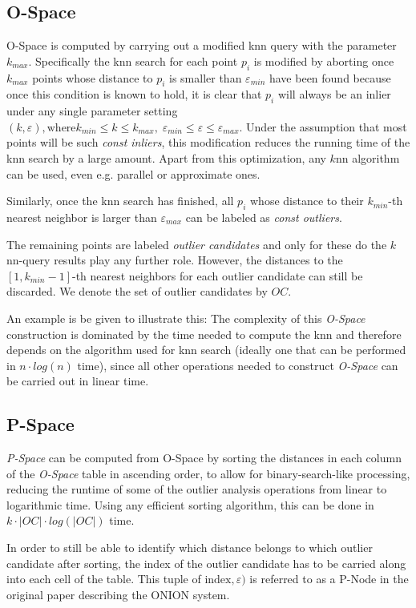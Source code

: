 \documentclass[runningheads]{llncs}
\begin{document}
\subsection{O-Space}
O-Space is computed by carrying out a modified knn query with the parameter $k_{max}$. Specifically  the knn search for each point $p_i$ is modified by aborting once $k_{max}$ points whose distance to $p_i$ is smaller than $\varepsilon_{min}$ have been found because once this condition is known to hold, it is clear that $p_i$ will always be an inlier under any single parameter setting $(k,\varepsilon), \text{where} k_{min}\leq k \leq k_{max},\; \varepsilon_{min}\leq \varepsilon \leq \varepsilon_{max}$. Under the assumption that most points will be such \emph{const inliers}, this modification reduces the running time of the knn search by a large amount. Apart from this optimization, any $k$nn algorithm can be used, even e.g. parallel or approximate ones.

Similarly, once the knn search has finished, all $p_i$ whose distance to their $k_{min}$-th nearest neighbor is larger than $\varepsilon_{max}$ can be labeled as \emph{const outliers}.

The remaining points are labeled \emph{outlier candidates} and only for these do the $k$nn-query results play any further role.  However, the distances to the $[1,k_{min}-1]$-th nearest neighbors for each outlier candidate can still be discarded. We denote the set of outlier candidates by $OC$.

An example is be given to illustrate this:
The complexity of this \emph{O-Space} construction is dominated by the time needed to compute the knn and therefore depends on the algorithm used for knn search (ideally one that can be performed in $n \cdot log(n)$ time), since all other operations needed to construct \emph{O-Space} can be carried out in linear time.
\subsection{P-Space}
\emph{P-Space} can be computed from O-Space by sorting the distances in each column of the \emph{O-Space} table in ascending order, to allow for binary-search-like processing, reducing the runtime of some of the outlier analysis operations from linear to logarithmic time. Using any efficient sorting algorithm, this can be done in $k \cdot |OC| \cdot log(|OC|)$ time. 

In order to still be able to identify which distance belongs to which outlier candidate after sorting, the index of the outlier candidate has to be carried along into each cell of the table. This tuple of $\text{index},\varepsilon)$ is referred to as a P-Node in the original paper describing the ONION system.
\end{document}

